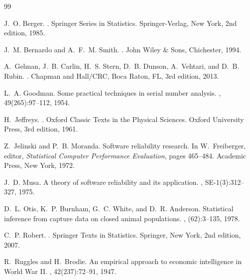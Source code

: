 \documentclass[10pt,a4paper]{article}
\begin{document}
\begin{thebibliography}{99}
\small
\setlength{\itemsep}{0pt}
\setlength{\parskip}{0pt}

J.~O. Berger.
.
\newblock Springer Series in Statistics. Springer-Verlag, New York, 2nd edition, 1985.

J.~M. Bernardo and A.~F.~M. Smith.
.
\newblock John Wiley \& Sons, Chichester, 1994.

A.~Gelman, J.~B. Carlin, H.~S. Stern, D.~B. Dunson, A.~Vehtari, and D.~B. Rubin.
.
\newblock Chapman and Hall/CRC, Boca Raton, FL, 3rd edition, 2013.

L.~A. Goodman.
\newblock Some practical techniques in serial number analysis.
, 49(265):97--112, 1954.

H.~Jeffreys.
.
\newblock Oxford Classic Texts in the Physical Sciences. Oxford University Press, 3rd edition, 1961.

Z.~Jelinski and P.~B. Moranda.
\newblock Software reliability research.
\newblock In W.~Freiberger, editor, {\em Statistical Computer Performance Evaluation}, pages 465--484. Academic Press, New York, 1972.

J.~D. Musa.
\newblock A theory of software reliability and its application.
, SE-1(3):312--327, 1975.

D.~L. Otis, K.~P. Burnham, G.~C. White, and D.~R. Anderson.
\newblock Statistical inference from capture data on closed animal populations.
, (62):3--135, 1978.

C.~P. Robert.
.
\newblock Springer Texts in Statistics. Springer, New York, 2nd edition, 2007.

R.~Ruggles and H.~Brodie.
\newblock An empirical approach to economic intelligence in {W}orld {W}ar {II}.
, 42(237):72--91, 1947.

\end{thebibliography}
\end{document}
